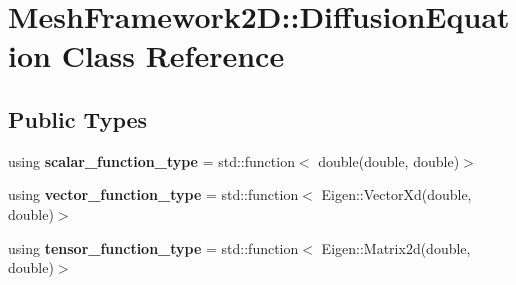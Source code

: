 \hypertarget{classMeshFramework2D_1_1DiffusionEquation}{}\section{Mesh\+Framework2D\+:\+:Diffusion\+Equation Class Reference}
\label{classMeshFramework2D_1_1DiffusionEquation}
\subsection*{Public Types}
\begin{DoxyCompactItemize}
\item 
\mbox{\label{classMeshFramework2D_1_1DiffusionEquation_ada3e820522863fe14bef41d1bce0ba74}} 
using {\bfseries scalar\+\_\+function\+\_\+type} = std\+::function$<$ double(double, double)$>$
\item 
\mbox{\label{classMeshFramework2D_1_1DiffusionEquation_a3bf70b3548ed3a584e21ff29f2caa3cf}} 
using {\bfseries vector\+\_\+function\+\_\+type} = std\+::function$<$ Eigen\+::\+Vector\+Xd(double, double)$>$
\item 
\mbox{\label{classMeshFramework2D_1_1DiffusionEquation_a1b33ed405c44806571099e232ac1abdd}} 
using {\bfseries tensor\+\_\+function\+\_\+type} = std\+::function$<$ Eigen\+::\+Matrix2d(double, double)$>$
\end{DoxyCompactItemize}
